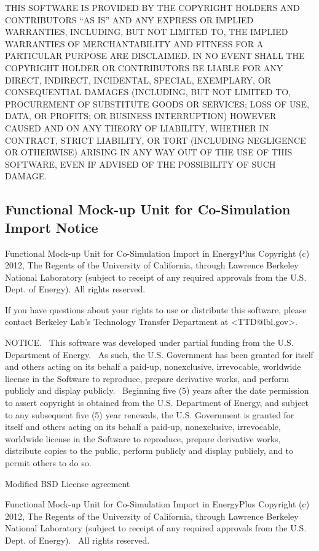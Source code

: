 THIS SOFTWARE IS PROVIDED BY THE COPYRIGHT HOLDERS AND CONTRIBUTORS ``AS IS'' AND ANY EXPRESS OR IMPLIED WARRANTIES, INCLUDING, BUT NOT LIMITED TO, THE IMPLIED WARRANTIES OF MERCHANTABILITY AND FITNESS FOR A PARTICULAR PURPOSE ARE DISCLAIMED. IN NO EVENT SHALL THE COPYRIGHT HOLDER OR CONTRIBUTORS BE LIABLE FOR ANY DIRECT, INDIRECT, INCIDENTAL, SPECIAL, EXEMPLARY, OR CONSEQUENTIAL DAMAGES (INCLUDING, BUT NOT LIMITED TO, PROCUREMENT OF SUBSTITUTE GOODS OR SERVICES; LOSS OF USE, DATA, OR PROFITS; OR BUSINESS INTERRUPTION) HOWEVER CAUSED AND ON ANY THEORY OF LIABILITY, WHETHER IN CONTRACT, STRICT LIABILITY, OR TORT (INCLUDING NEGLIGENCE OR OTHERWISE) ARISING IN ANY WAY OUT OF THE USE OF THIS SOFTWARE, EVEN IF ADVISED OF THE POSSIBILITY OF SUCH DAMAGE.

\subsection{Functional Mock-up Unit for Co-Simulation Import Notice}\label{functional-mock-up-unit-for-co-simulation-import-notice}

Functional Mock-up Unit for Co-Simulation Import in EnergyPlus Copyright (c) 2012, The Regents of the University of California, through Lawrence Berkeley National Laboratory (subject to receipt of any required approvals from the U.S. Dept. of Energy). All rights reserved.

If you have questions about your rights to use or distribute this software, please contact Berkeley Lab's Technology Transfer Department at \textless{}TTD@lbl.gov\textgreater{}.

NOTICE.~ This software was developed under partial funding from the U.S. Department of Energy.~ As such, the U.S. Government has been granted for itself and others acting on its behalf a paid-up, nonexclusive, irrevocable, worldwide license in the Software to reproduce, prepare derivative works, and perform publicly and display publicly.~ Beginning five (5) years after the date permission to assert copyright is obtained from the U.S. Department of Energy, and subject to any subsequent five (5) year renewals, the U.S. Government is granted for itself and others acting on its behalf a paid-up, nonexclusive, irrevocable, worldwide license in the Software to reproduce, prepare derivative works, distribute copies to the public, perform publicly and display publicly, and to permit others to do so.

Modified BSD License agreement

Functional Mock-up Unit for Co-Simulation Import in EnergyPlus Copyright (c) 2012, The Regents of the University of California, through Lawrence Berkeley National Laboratory (subject to receipt of any required approvals from the U.S. Dept. of Energy).~ All rights reserved.

